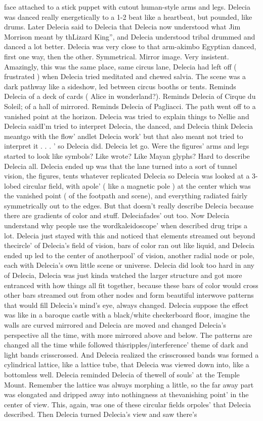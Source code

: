 \documentclass[12pt]{book}
\begin{document}
face attached to a stick puppet with cutout human-style arms and legs. Delecia was danced really energetically to a 1-2 beat like a heartbeat, but pounded, like drums. Later Delecia said to Delecia that Delecia now understood what Jim Morrison meant by thLizard King'', and Delecia understood tribal drummed and danced a lot better. Delecia was very close to that arm-akimbo Egyptian danced, first one way, then the other. Symmetrical. Mirror image. Very insistent. Amazingly, this was the same place, same circus lane, Delecia had left off ( frustrated ) when Delecia tried meditated and chewed salvia. The scene was a dark pathway like a sideshow, led between circus booths or tents. Reminds Delecia of a deck of cards ( Alice in wonderland?). Reminds Delecia of Cirque du Soleil; of a hall of mirrored. Reminds Delecia of Pagliacci. The path went off to a vanished point at the horizon. Delecia was tried to explain things to Nellie and Delecia saidI'm tried to interpret Delecia, the danced, and Delecia think Delecia meantgo with the flow' andlet Delecia work' but that also meant not tried to interpret it . . . ' so Delecia did. Delecia let go. Were the figures' arms and legs started to look like symbols? Like wrote? Like Mayan glyphs? Hard to describe Delecia all. Delecia ended up was that the lane turned into a sort of tunnel vision, the figures, tents whatever replicated Delecia so Delecia was looked at a 3-lobed circular field, with apole' ( like a magnetic pole ) at the center which was the vanished point ( of the footpath and scene), and everything radiated fairly symmetrically out to the edges. But that doesn't really describe Delecia because there are gradients of color and stuff. Deleciafades' out too. Now Delecia understand why people use the wordkaleidoscope' when described drug trips a lot. Delecia just stayed with this and noticed that elements streamed out beyond thecircle' of Delecia's field of vision, bars of color ran out like liquid, and Delecia ended up led to the center of anotherpool' of vision, another radial node or pole, each with Delecia's own little scene or universe. Delecia did look too hard in any of Delecia, Delecia was just kinda watched the larger structure and got more entranced with how things all fit together, because these bars of color would cross other bars streamed out from other nodes and form beautiful interwove patterns that would fill Delecia's mind's eye, always changed. Delecia suppose the effect was like in a baroque castle with a black/white checkerboard floor, imagine the walls are curved mirrored and Delecia are moved and changed Delecia's perspective all the time, with more mirrored above and below. The patterns are changed all the time while followed thisripples/interference' theme of dark and light bands crisscrossed. And Delecia realized the crisscrossed bands was formed a cylindrical lattice, like a lattice tube, that Delecia was viewed down into, like a bottomless well. Delecia reminded Delecia of thewell of souls' at the Temple Mount. Remember the lattice was always morphing a little, so the far away part was elongated and dripped away into nothingness at thevanishing point' in the center of view. This, again, was one of these circular fields orpoles' that Delecia described. Then Delecia turned Delecia's view and saw there's 
\end{document}
